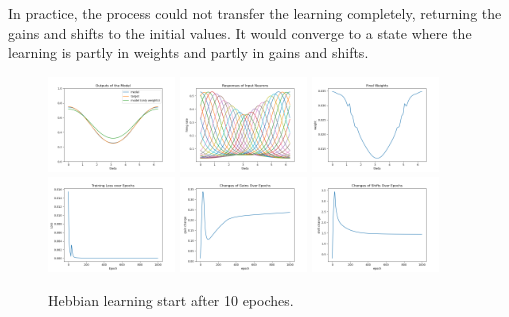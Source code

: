 \documentclass[12pt, a4paper]{article}
\begin{document}
In practice, the process could not transfer the learning completely, returning the gains and shifts to the initial values. It would converge to a state where the learning is partly in weights and partly in gains and shifts. 

\begin{figure}[H]
    \centering
    \includegraphics[width=0.3\textwidth]{baseline_abb05/fig/0122_abb05_bphebb_onlyweights.png}
    \includegraphics[width=0.3\textwidth]{baseline_abb05/fig/0122_abb05_bphebb_rf.png}
    \includegraphics[width=0.3\textwidth]{baseline_abb05/fig/0122_abb05_bphebb_weights.png}
    \\
    \includegraphics[width=0.3\textwidth]{baseline_abb05/fig/0122_abb05_bphebb_loss.png}
    \includegraphics[width=0.3\textwidth]{baseline_abb05/fig/0122_abb05_bphebb_gc.png}
    \includegraphics[width=0.3\textwidth]{baseline_abb05/fig/0122_abb05_bphebb_sc.png}\\
    \caption{Hebbian learning start after 10 epoches.}
\end{figure}
\end{document}
